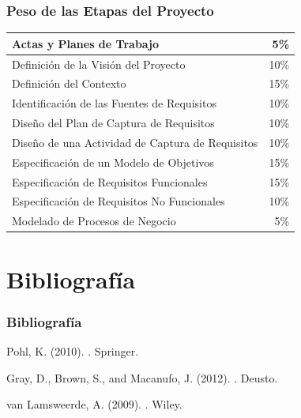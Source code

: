 \documentclass[handout,a4paper,slidestop,xcolor=pst,dvips,blue]{beamer}
\begin{document}
\begin{frame}[c]
	\frametitle{Peso de las Etapas del Proyecto}
    \begin{center}
	\begin{tabular}{||l|r||}
    \hline \hline
    Actas y Planes de Trabajo        & 5\% \\ \hline
    Definición de la Visión del Proyecto        & 10\% \\ \hline
    Definición del Contexto                           & 15\% \\ \hline
    Identificación de las Fuentes de Requisitos & 10\% \\ \hline
    Diseño del Plan de Captura de Requisitos    & 10\% \\ \hline \hline
    Diseño de una Actividad de Captura de Requisitos & 10\% \\ \hline
    Especificación de un Modelo de Objetivos    & 15\% \\ \hline
    Especificación de Requisitos Funcionales    & 15\% \\ \hline
    Especificación de Requisitos No Funcionales & 10\% \\ \hline \hline
    Modelado de Procesos de Negocio             &  5\% \\ \hline \hline
	\end{tabular}
\end{center}
\end{frame}

\section{Bibliografía}

\begin{frame}[c]
	\frametitle{Bibliografía}
\begin{thebibliography}{}

Pohl, K. (2010).
.
\newblock Springer.

Gray, D., Brown, S., and Macanufo, J. (2012).
.
\newblock Deusto.

van Lamsweerde, A. (2009).
.
\newblock Wiley.

\end{thebibliography}
\end{frame}
\end{document}
